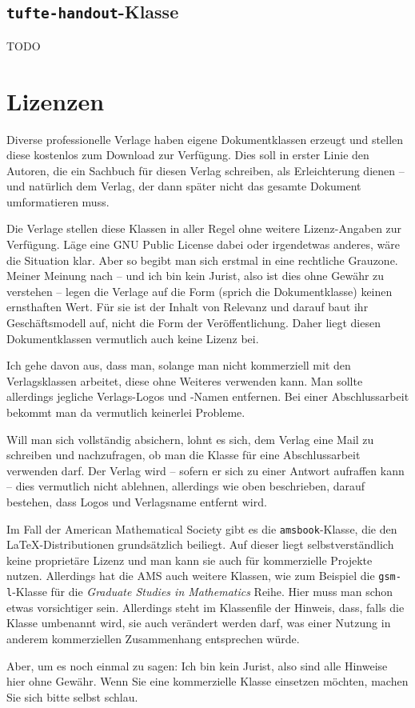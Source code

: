 \subsection{\texttt{tufte-handout}-Klasse}
TODO


\section{Lizenzen}

Diverse professionelle Verlage haben eigene Dokumentklassen erzeugt und stellen diese kostenlos zum Download zur Verfügung. Dies soll in erster Linie den Autoren, die ein Sachbuch für diesen Verlag schreiben, als Erleichterung dienen -- und natürlich dem Verlag, der dann später nicht das gesamte Dokument umformatieren muss. 

Die Verlage stellen diese Klassen in aller Regel ohne weitere Lizenz-An\-ga\-ben zur Verfügung. Läge eine GNU Public License dabei oder irgendetwas anderes, wäre die Situation klar. Aber so begibt man sich erstmal in eine rechtliche Grauzone. Meiner Meinung nach -- und ich bin kein Jurist, also ist dies ohne Gewähr zu verstehen -- legen die Verlage auf die Form (sprich die Dokumentklasse) keinen ernsthaften Wert. Für sie ist der Inhalt von Relevanz und darauf baut ihr Geschäftsmodell auf, nicht die Form der Veröffentlichung. Daher liegt diesen Dokumentklassen vermutlich auch keine Lizenz bei. 

Ich gehe davon aus, dass man, solange man nicht kommerziell mit den Verlagsklassen arbeitet, diese ohne Weiteres verwenden kann. Man sollte allerdings jegliche Verlags-Logos und -Namen entfernen. Bei einer Abschlussarbeit bekommt man da vermutlich keinerlei Probleme.

Will man sich vollständig absichern, lohnt es sich, dem Verlag eine Mail zu schreiben und nachzufragen, ob man die Klasse für eine Abschlussarbeit verwenden darf. Der Verlag wird -- sofern er sich zu einer Antwort aufraffen kann -- dies vermutlich nicht ablehnen, allerdings wie oben beschrieben, darauf bestehen, dass Logos und Verlagsname entfernt wird. 

Im Fall der American Mathematical Society gibt es die \texttt{amsbook}-Klasse, die den \LaTeX-Distributionen grundsätzlich beiliegt. Auf dieser liegt selbstverständlich keine proprietäre Lizenz und man kann sie auch für kommerzielle Projekte nutzen. Allerdings hat die AMS auch weitere Klassen, wie zum Beispiel die \texttt{gsm-l}-Klasse für die \textsl{Graduate Studies in Mathematics} Reihe. Hier muss man schon etwas vorsichtiger sein. Allerdings steht im Klassenfile der Hinweis, dass, falls die Klasse umbenannt wird, sie auch verändert werden darf, was einer Nutzung in anderem kommerziellen Zusammenhang entsprechen würde. 

Aber, um es noch einmal zu sagen: Ich bin kein Jurist, also sind alle Hinweise hier ohne Gewähr. Wenn Sie eine kommerzielle Klasse einsetzen möchten, machen Sie sich bitte selbst schlau. 




